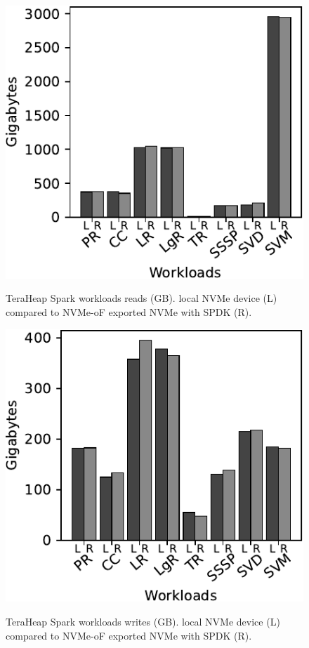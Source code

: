 \begin{figure}[H]
  \includegraphics[width=\linewidth]{figures/spark_r.pdf}\\
\caption{TeraHeap Spark workloads reads (GB). local NVMe device (L) compared to NVMe-oF exported NVMe with SPDK (R).}
\label{fig:spark_r}
\end{figure}
\begin{figure}[H]
  \includegraphics[width=\linewidth]{figures/spark_w.pdf}\\
\caption{TeraHeap Spark workloads writes (GB). local NVMe device (L) compared to NVMe-oF exported NVMe with SPDK (R).}
\label{fig:spark_w}
\end{figure}
